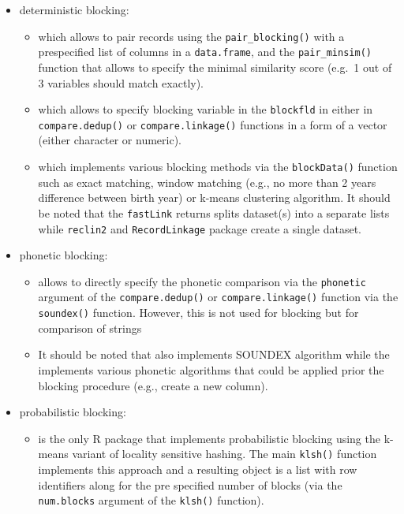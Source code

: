 \begin{itemize}
\tightlist
\item
  deterministic blocking:

  \begin{itemize}
  \tightlist
  \item
     \citep[\citet{reclin2-rjournal}]{reclin2} which allows to pair records using the \texttt{pair\_blocking()} with a prespecified list of columns in a \texttt{data.frame}, and the \texttt{pair\_minsim()} function that allows to specify the minimal similarity score (e.g.~1 out of 3 variables should match exactly).
  \item
     \citep[\citet{RecordLinkage-rjournal}]{RecordLinkage} which allows to specify blocking variable in the \texttt{blockfld} in either in \texttt{compare.dedup()} or \texttt{compare.linkage()} functions in a form of a vector (either character or numeric).
  \item
     \citep[\citet{enamorado2019using}]{fastLink} which implements various blocking methods via the \texttt{blockData()} function such as exact matching, window matching (e.g., no more than 2 years difference between birth year) or k-means clustering algorithm. It should be noted that the \texttt{fastLink} returns splits dataset(s) into a separate lists while \texttt{reclin2} and \texttt{RecordLinkage} package create a single dataset.
  \end{itemize}
\item
  phonetic blocking:

  \begin{itemize}
  \tightlist
  \item
     allows to directly specify the phonetic comparison via the \texttt{phonetic} argument of the \texttt{compare.dedup()} or \texttt{compare.linkage()} function via the \texttt{soundex()} function. However, this is not used for blocking but for comparison of strings
  \item
    It should be noted that  \citep{stringdist} also implements SOUNDEX algorithm while the  \citep[\citet{Phonetic2020}]{phonics} implements various phonetic algorithms that could be applied prior the blocking procedure (e.g., create a new column).
  \end{itemize}
\item
  probabilistic blocking:

  \begin{itemize}
  \tightlist
  \item
     \citep{klsh} is the only R package that implements probabilistic blocking using the k-means variant of locality sensitive hashing. The main \texttt{klsh()} function implements this approach and a resulting object is a list with row identifiers along for the pre specified number of blocks (via the \texttt{num.blocks} argument of the \texttt{klsh()} function).
  \end{itemize}
\end{itemize}

